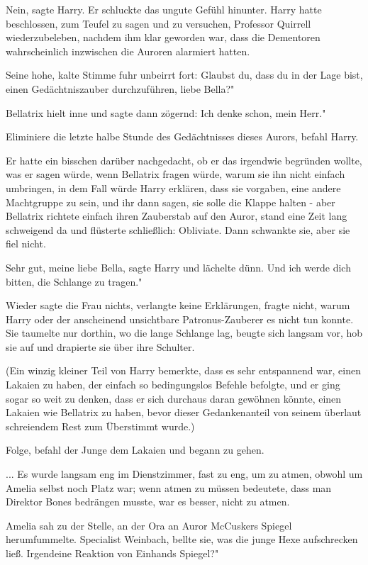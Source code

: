 \glqq Nein\grqq{}, sagte Harry. Er schluckte das ungute Gefühl hinunter. Harry
hatte beschlossen, zum Teufel zu sagen und zu versuchen, Professor Quirrell
wiederzubeleben, nachdem ihm klar geworden war, dass die Dementoren
wahrscheinlich inzwischen die Auroren alarmiert hatten.

Seine hohe, kalte Stimme fuhr unbeirrt fort: \glqq Glaubst du, dass du in der
Lage bist, einen Gedächtniszauber durchzuführen, liebe Bella?"

Bellatrix hielt inne und sagte dann zögernd: \glqq Ich denke schon, mein Herr."

\glqq Eliminiere die letzte halbe Stunde des Gedächtnisses dieses Aurors\grqq{},
befahl Harry.

Er hatte ein bisschen darüber nachgedacht, ob er das irgendwie begründen wollte,
was er sagen würde, wenn Bellatrix fragen würde, warum sie ihn nicht einfach
umbringen, in dem Fall würde Harry erklären, dass sie vorgaben, eine andere
Machtgruppe zu sein, und ihr dann sagen, sie solle die Klappe halten - aber
Bellatrix richtete einfach ihren Zauberstab auf den Auror, stand eine Zeit lang
schweigend da und flüsterte schließlich: \glqq Obliviate.\grqq{} Dann schwankte
sie, aber sie fiel nicht.

\glqq Sehr gut, meine liebe Bella\grqq{}, sagte Harry und lächelte dünn. \glqq
Und ich werde dich bitten, die Schlange zu tragen."

Wieder sagte die Frau nichts, verlangte keine Erklärungen, fragte nicht, warum
Harry oder der anscheinend unsichtbare Patronus-Zauberer es nicht tun konnte.
Sie taumelte nur dorthin, wo die lange Schlange lag, beugte sich langsam vor,
hob sie auf und drapierte sie über ihre Schulter.

(Ein winzig kleiner Teil von Harry bemerkte, dass es sehr entspannend war, einen
Lakaien zu haben, der einfach so bedingungslos Befehle befolgte, und er ging
sogar so weit zu denken, dass er sich durchaus daran gewöhnen könnte, einen
Lakaien wie Bellatrix zu haben, bevor dieser Gedankenanteil von seinem überlaut
schreiendem Rest zum Überstimmt wurde.)

\glqq Folge\grqq{}, befahl der Junge dem Lakaien und begann zu gehen.

... Es wurde langsam eng im Dienstzimmer, fast zu eng, um zu atmen, obwohl um
Amelia selbst noch Platz war; wenn atmen zu müssen bedeutete, dass man Direktor
Bones bedrängen musste, war es besser, nicht zu atmen.

Amelia sah zu der Stelle, an der Ora an Auror McCuskers Spiegel herumfummelte.
\glqq Specialist Weinbach\grqq{}, bellte sie, was die junge Hexe aufschrecken
ließ. \glqq Irgendeine Reaktion von Einhands Spiegel?"

